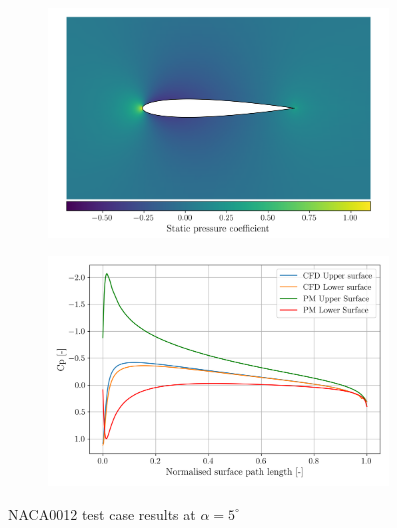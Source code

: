\documentclass{article}
\begin{document}
\begin{figure}[H]
    \centering
    \begin{subfigure}{0.49\textwidth}
        \centering
        \includegraphics[width=0.99\textwidth]{figures/naca0012_cp_5.0.png}
        \caption{}
        \label{fig:naca0012_cp5}
    \end{subfigure}
    \begin{subfigure}{0.49\textwidth}
        \centering
        \includegraphics[width=0.99\textwidth]{figures/naca0012_surface_cp_5.0.png}
        \caption{}
        \label{fig:naca0012_surface_cp5}
    \end{subfigure}
    \caption{NACA0012 test case results at $\alpha = 5^\circ$}
\end{figure}
\end{document}
